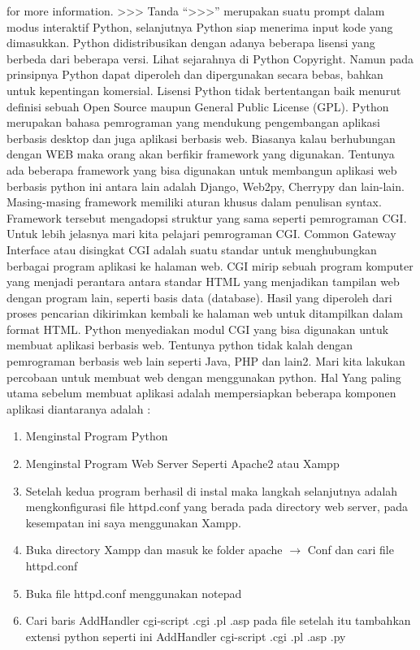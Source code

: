 \begin{enumerate}
for more information. 
>>> 
Tanda “>>>” merupakan suatu prompt dalam modus interaktif Python, selanjutnya Python siap menerima input kode yang dimasukkan. 
Python didistribusikan dengan adanya beberapa lisensi yang berbeda dari beberapa versi. Lihat sejarahnya di Python Copyright. Namun pada prinsipnya Python dapat diperoleh dan dipergunakan secara bebas, bahkan untuk kepentingan komersial. Lisensi Python tidak bertentangan baik menurut definisi sebuah Open Source maupun General Public License (GPL). 
Python merupakan bahasa pemrograman yang mendukung pengembangan aplikasi berbasis desktop dan juga aplikasi berbasis web. Biasanya kalau berhubungan dengan WEB maka orang akan berfikir framework yang digunakan. Tentunya ada beberapa framework yang bisa digunakan untuk membangun aplikasi web berbasis python ini antara lain adalah Django, Web2py, Cherrypy dan lain-lain. Masing-masing framework memiliki aturan khusus dalam penulisan syntax. Framework tersebut mengadopsi struktur yang sama seperti pemrograman CGI. Untuk lebih jelasnya mari kita pelajari pemrograman CGI. 
Common Gateway Interface atau disingkat CGI adalah suatu standar untuk menghubungkan berbagai program aplikasi ke halaman web. CGI mirip sebuah program komputer yang menjadi perantara antara standar HTML yang menjadikan tampilan web dengan program lain, seperti basis data (database). Hasil yang diperoleh dari proses pencarian dikirimkan kembali ke halaman web untuk ditampilkan dalam format HTML.
Python menyediakan modul CGI yang bisa digunakan untuk membuat aplikasi berbasis web. Tentunya python tidak kalah dengan pemrograman berbasis web lain seperti Java, PHP dan lain2. Mari kita lakukan percobaan untuk membuat web dengan menggunakan python. 
Hal Yang paling utama sebelum membuat aplikasi adalah mempersiapkan beberapa komponen aplikasi diantaranya adalah : 
\begin{enumerate}
	\item Menginstal Program Python  
	\item Menginstal Program Web Server Seperti Apache2 atau Xampp  
	\item Setelah kedua program berhasil di instal maka langkah selanjutnya adalah mengkonfigurasi file httpd.conf yang berada pada directory web server, pada kesempatan ini saya menggunakan Xampp. 
	\item Buka directory Xampp dan masuk ke folder apache  $  \rightarrow  $ Conf dan cari file httpd.conf 
	\item Buka file httpd.conf menggunakan notepad 
	\item Cari baris AddHandler cgi-script .cgi .pl .asp pada file setelah itu tambahkan extensi python seperti ini AddHandler cgi-script .cgi .pl .asp .py 

\end{enumerate}
\end{enumerate}
